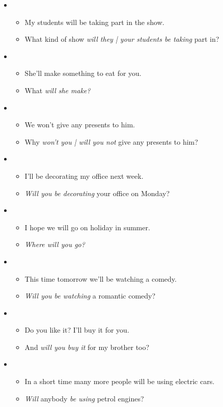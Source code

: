 \begin{itemize}

\item
\begin{itemize}
\item My students will be taking part in the show.
\item What kind of show \textit{will they | your students be taking} part in?
\end{itemize}

\item
\begin{itemize}
\item She'll make something to eat for you.
\item What \textit{will she make?}
\end{itemize}

\item
\begin{itemize}
\item We won't give any presents to him. 
\item Why \textit{won't you | will you not} give any presents to him? 
\end{itemize}

\item
\begin{itemize}
\item I'll be decorating my office next week.
\item \textit{Will you be decorating} your office on Monday?
\end{itemize}

\item
\begin{itemize}
\item I hope we will go on holiday in summer.
\item \textit{Where will you go?}
\end{itemize}

\item
\begin{itemize}
\item This time tomorrow we'll be watching a comedy.
\item \textit{Will you be watching} a romantic comedy?
\end{itemize}

\item
\begin{itemize}
\item Do you like it? I'll buy it for you.
\item And \textit{will you buy it} for my brother too?
\end{itemize}

\item
\begin{itemize}
\item In a short time many more people will be using electric cars.
\item \textit{Will} anybody \textit{be using} petrol engines?
\end{itemize}

\end{itemize}

